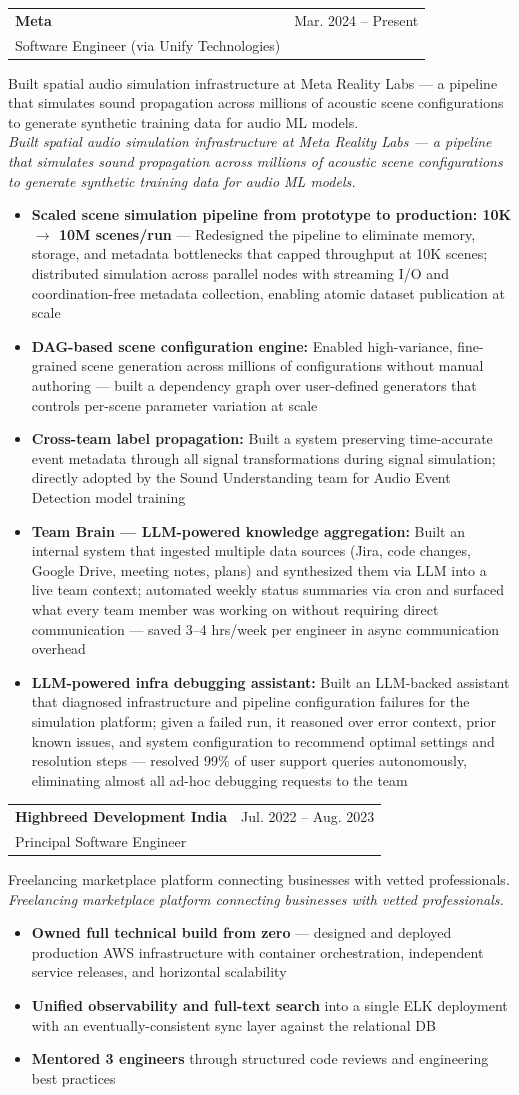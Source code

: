 \documentclass[letterpaper,10pt]{article}
\makeatletter
\newcommand{\resumeItem}[1]{
  \item\small{
    {#1 \vspace{-2pt}}
  }
}
\newcommand{\resumeSubheading}[5]{
  \vspace{-2pt}\item
    \begin{tabular*}{0.97\textwidth}[t]{l@{\extracolsep{\fill}}r}
      \textbf{#1} & #2 \\
      {\small#3} & {\small #4} \\
    \end{tabular*}
    \ifx\relax#5\relax\else\\\small\textit{#5}\fi\vspace{-5pt}
}
\newcommand{\resumeItemListStart}{\begin{itemize}[itemsep=4pt, parsep=0pt]}
\newcommand{\resumeItemListEnd}{\end{itemize}\vspace{-5pt}}
\makeatother
\begin{document}
    \resumeSubheading
    {Meta}{Mar. 2024 -- Present}
    {Software Engineer (via Unify Technologies)}{}
      {Built spatial audio simulation infrastructure at Meta Reality Labs --- a pipeline that simulates sound propagation across millions of acoustic scene configurations to generate synthetic training data for audio ML models.}
      \resumeItemListStart
        \resumeItem{\textbf{Scaled scene simulation pipeline from prototype to production: 10K $\rightarrow$ 10M scenes/run} --- Redesigned the pipeline to eliminate memory, storage, and metadata bottlenecks that capped throughput at 10K scenes; distributed simulation across parallel nodes with streaming I/O and coordination-free metadata collection, enabling atomic dataset publication at scale}
        \resumeItem{\textbf{DAG-based scene configuration engine:} Enabled high-variance, fine-grained scene generation across millions of configurations without manual authoring --- built a dependency graph over user-defined generators that controls per-scene parameter variation at scale}
        \resumeItem{\textbf{Cross-team label propagation:} Built a system preserving time-accurate event metadata through all signal transformations during signal simulation; directly adopted by the Sound Understanding team for Audio Event Detection model training}
        \resumeItem{\textbf{Team Brain --- LLM-powered knowledge aggregation:} Built an internal system that ingested multiple data sources (Jira, code changes, Google Drive, meeting notes, plans) and synthesized them via LLM into a live team context; automated weekly status summaries via cron and surfaced what every team member was working on without requiring direct communication --- saved 3--4 hrs/week per engineer in async communication overhead}
        \resumeItem{\textbf{LLM-powered infra debugging assistant:} Built an LLM-backed assistant that diagnosed infrastructure and pipeline configuration failures for the simulation platform; given a failed run, it reasoned over error context, prior known issues, and system configuration to recommend optimal settings and resolution steps --- resolved 99\% of user support queries autonomously, eliminating almost all ad-hoc debugging requests to the team}
      \resumeItemListEnd

    \resumeSubheading
      {Highbreed Development India}{Jul. 2022 -- Aug. 2023}
      {Principal Software Engineer}{}
      {Freelancing marketplace platform connecting businesses with vetted professionals.}
      \resumeItemListStart
        \resumeItem{\textbf{Owned full technical build from zero} --- designed and deployed production AWS infrastructure with container orchestration, independent service releases, and horizontal scalability}
        \resumeItem{\textbf{Unified observability and full-text search} into a single ELK deployment with an eventually-consistent sync layer against the relational DB}
        \resumeItem{\textbf{Mentored 3 engineers} through structured code reviews and engineering best practices}
      \resumeItemListEnd
\end{document}

